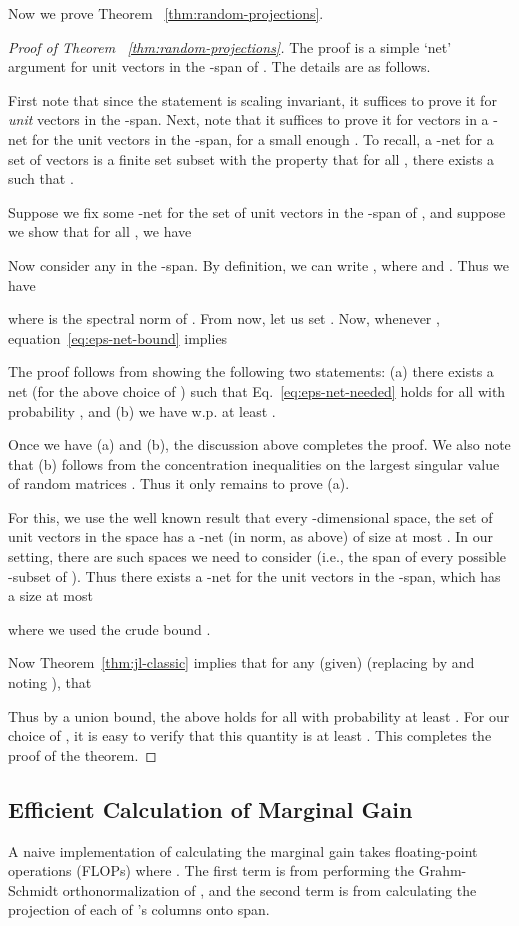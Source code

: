 \documentclass{article}
\begin{document}
Now we prove Theorem ~\ref{thm:random-projections}.
\begin{proof}[Proof of Theorem ~\ref{thm:random-projections}]
The proof is a simple `net' argument for unit vectors in the -span
of .  The details are as follows.

First note that since the statement is scaling invariant, it suffices
to prove it for {\em unit} vectors  in the -span. Next, note
that it suffices to prove it for vectors in a -net for the
unit vectors in the -span, for a small enough . To recall,
a -net for a set of vectors  is a finite set subset
 with the property that for all , there exists a
 such that .

Suppose we fix some -net for the set of unit vectors in the
-span of , and suppose we show that for all , we have

Now consider any  in the -span. By definition, we can write , where  and .  Thus we
have

where  is the spectral norm of .  From now, let us set
.  Now, whenever
,
equation~\eqref{eq:eps-net-bound} implies


The proof follows from showing the following two statements: (a) there
exists a net  (for the above choice of ) such
that Eq.~\eqref{eq:eps-net-needed} holds for all 
with probability , and (b) we have  w.p. at least .

Once we have (a) and (b), the discussion above completes the proof. We
also note that (b) follows from the concentration inequalities on the
largest singular value of random matrices \cite{Rudelson}. Thus it only remains to prove (a).

For this, we use the well known result that every
-dimensional space, the set of unit vectors in the space has a
-net (in  norm, as above) of size at most
 \cite{Vershynin}. In our setting, there are 
such spaces we need to consider (i.e., the span of every possible
-subset of ).  Thus there exists a -net
for the unit vectors in the -span, which has a size at most

where we used the crude bound .

Now Theorem~\ref{thm:jl-classic} implies that for any (given)  (replacing  by  and noting ), that


Thus by a union bound, the above holds for all 
with probability at least .
For our choice of , it is easy to verify that this quantity is at
least .  This completes the proof of the theorem.
\end{proof}

\subsection{Efficient Calculation of Marginal Gain}\label{sec:app:marginal}
A naive implementation of calculating the marginal gain  takes  floating-point operations (FLOPs) where . The first term is from performing the Grahm-Schmidt orthonormalization of , and the second term is from calculating the projection of each of 's columns onto span.
\end{document}
